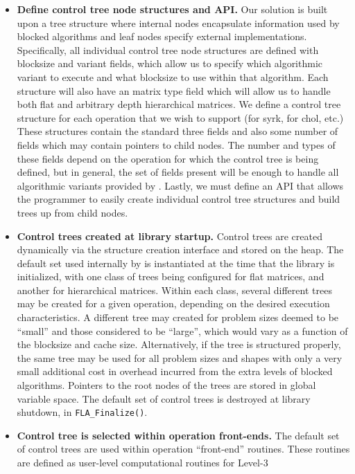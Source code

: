 \begin{itemize}
\item
{\bf Define control tree node structures and API.}
Our solution is built upon a tree structure where internal nodes
encapsulate information used by blocked algorithms and leaf nodes
specify external implementations.
Specifically, all individual control tree node structures are defined
with blocksize and variant fields, which allow us to specify which
algorithmic variant to execute and what blocksize to use within that
algorithm.
Each structure will also have an matrix type field which will allow
us to handle both flat and arbitrary depth hierarchical matrices.
We define a control tree structure for each operation that we wish
to support (\flasyrkt for {\sc syrk}, \flacholt for {\sc chol}, etc.)
These structures contain the standard three fields and also some number
of fields which may contain pointers to child nodes.
The number and types of these fields depend on the operation for which
the control tree is being defined, but in general, the set of fields
present will be enough to handle all algorithmic variants provided by
\libflamens.
Lastly, we must define an API that allows the programmer to easily
create individual control tree structures and build trees up from child
nodes.
\item
{\bf Control trees created at library startup.}
Control trees are created dynamically via the structure creation
interface and stored on the heap.
The default set used internally by \libflame is instantiated at the time
that the library is initialized, with one class of trees being configured
for flat matrices, and another for hierarchical matrices.
Within each class, several different trees may be created for a given
operation, depending on the desired execution characteristics.
A different tree may created for problem sizes deemed to be ``small''
and those considered to be ``large'', which would vary as a function
of the blocksize and cache size.
Alternatively, if the tree is structured properly, the same tree
may be used for all problem sizes and shapes with only a very small
additional cost in overhead incurred from the extra levels of blocked
algorithms.
Pointers to the root nodes of the trees are stored in global variable
space.
The default set of control trees is destroyed at library shutdown, in
{\tt FLA\_Finalize()}.
\item
{\bf Control tree is selected within operation front-ends.}
The default set of control trees are used within operation ``front-end''
routines.
These routines are defined as user-level computational routines for Level-3

\end{itemize}
